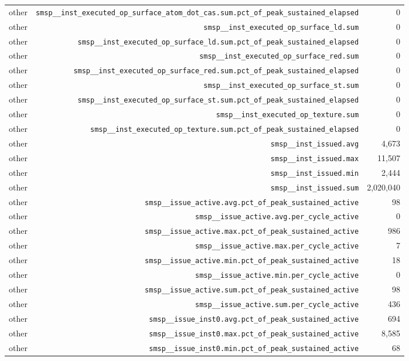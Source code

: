 \begin{table}[h]
\begin{tabular}{|l|r|r|}
other & \texttt{smsp__inst_executed_op_surface_atom_dot_cas.sum.pct_of_peak_sustained_elapsed} & 0 \\
other & \texttt{smsp__inst_executed_op_surface_ld.sum} & 0 \\
other & \texttt{smsp__inst_executed_op_surface_ld.sum.pct_of_peak_sustained_elapsed} & 0 \\
other & \texttt{smsp__inst_executed_op_surface_red.sum} & 0 \\
other & \texttt{smsp__inst_executed_op_surface_red.sum.pct_of_peak_sustained_elapsed} & 0 \\
other & \texttt{smsp__inst_executed_op_surface_st.sum} & 0 \\
other & \texttt{smsp__inst_executed_op_surface_st.sum.pct_of_peak_sustained_elapsed} & 0 \\
other & \texttt{smsp__inst_executed_op_texture.sum} & 0 \\
other & \texttt{smsp__inst_executed_op_texture.sum.pct_of_peak_sustained_elapsed} & 0 \\
other & \texttt{smsp__inst_issued.avg} & 4,673 \\
other & \texttt{smsp__inst_issued.max} & 11,507 \\
other & \texttt{smsp__inst_issued.min} & 2,444 \\
other & \texttt{smsp__inst_issued.sum} & 2,020,040 \\
other & \texttt{smsp__issue_active.avg.pct_of_peak_sustained_active} & 98 \\
other & \texttt{smsp__issue_active.avg.per_cycle_active} & 0 \\
other & \texttt{smsp__issue_active.max.pct_of_peak_sustained_active} & 986 \\
other & \texttt{smsp__issue_active.max.per_cycle_active} & 7 \\
other & \texttt{smsp__issue_active.min.pct_of_peak_sustained_active} & 18 \\
other & \texttt{smsp__issue_active.min.per_cycle_active} & 0 \\
other & \texttt{smsp__issue_active.sum.pct_of_peak_sustained_active} & 98 \\
other & \texttt{smsp__issue_active.sum.per_cycle_active} & 436 \\
other & \texttt{smsp__issue_inst0.avg.pct_of_peak_sustained_active} & 694 \\
other & \texttt{smsp__issue_inst0.max.pct_of_peak_sustained_active} & 8,585 \\
other & \texttt{smsp__issue_inst0.min.pct_of_peak_sustained_active} & 68 \\

\end{tabular}
\end{table}
